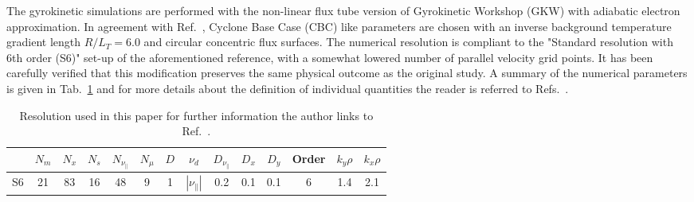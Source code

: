 \documentclass[aip, amsmath, amssymb, reprint, twocolumn, floatfix]{revtex4-1}
\newcommand{\rlt}{R/L_T}
\begin{document}
The gyrokinetic simulations are performed with the non-linear flux tube version of Gyrokinetic Workshop (GKW) \cite{peeters2009} with adiabatic electron approximation.
In agreement with Ref.~\cite{peeters2016}, Cyclone Base Case (CBC) like parameters are chosen with an inverse background temperature gradient length $\rlt = 6.0$ and circular concentric flux surfaces. 
The numerical resolution is compliant to the "Standard resolution with 6th order (S6)" set-up of the aforementioned reference, with a somewhat lowered number of parallel velocity grid points.
It has been carefully verified that this modification preserves the same physical outcome as the original study.
A summary of the numerical parameters is given in Tab.~\ref{tab:resolution} and for more details about the definition of individual quantities the reader is referred to Refs.~\cite{peeters2009, peeters2016}.
\begin{table}[ht]
	\begin{ruledtabular}
		\begin{tabular}{l | ccccc | ccccc | c | cc}
			& $N_m$ & $N_x$ & $N_s$ & $N_{\nu_\parallel}$ & $N_\mu$ & $D$ & $\nu_d$           & $D_{\nu_\parallel}$ & $D_x$ & $D_y$ & Order & $k_y\rho$ & $k_x\rho$ \\
			\hline
			S6   & 21    & 83    & 16    & 48                  & 9       & 1   & $|\nu_\parallel|$ & 0.2                 & 0.1   & 0.1   & 6     & 1.4       & 2.1       \\
		\end{tabular}
	\end{ruledtabular}
	\caption{
		Resolution used in this paper for further information the author links to Ref.~\cite{peeters2016}. %
	}
	\label{tab:resolution}
\end{table}

\end{document}
